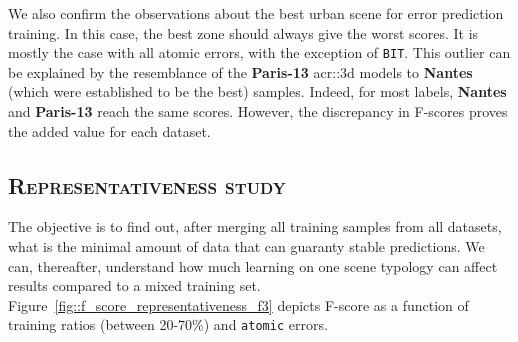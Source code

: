         We also confirm the observations about the best urban scene for error prediction training.
        In this case, the best zone should always give the worst scores.
        It is mostly the case with all atomic errors, with the exception of \texttt{BIT}.
        This outlier can be explained by the resemblance of the \textbf{Paris-13} \gls{acr::3d} models to \textbf{Nantes} (which were established to be the best) samples.
        Indeed, for most labels, \textbf{Nantes} and \textbf{Paris-13} reach the same scores.
        However, the discrepancy in F-scores proves the added value for each dataset.
    
    \subsection{\textsc{Representativeness study}}
        \label{subsec::more_experiments::scalability::representativeness}
        The objective is to find out, after merging all training samples from all datasets, what is the minimal amount of data that can guaranty stable predictions.
        We can, thereafter, understand how much learning on one scene typology can affect results compared to a mixed training set.
        Figure~\ref{fig::f_score_representativeness_f3} depicts F-score as a function of training ratios (between 20-70\%) and \texttt{atomic} errors.\\
                
        \begin{figure}[htbp]
        \end{figure}
            
